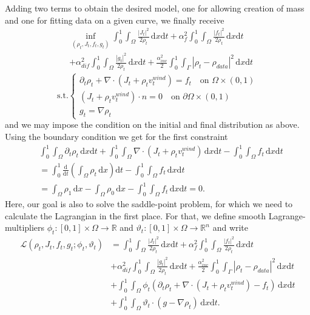 Adding two terms to obtain the desired model, one for allowing creation of mass and one for fitting data on a given curve, we finally receive 
\begin{align*}
&\inf_{(\rho_t, J_t, f_t, g_t)} \int_0^1\int_\Omega \frac{|J_t|^2}{2\rho_t}\,\mathrm{d}x\mathrm{d}t + \alpha_f^2 \int_0^1\int_\Omega \frac{|f_t|^2}{2\rho_t}\,\mathrm{d}x\mathrm{d}t \\&+ \alpha_{dif}^2\int_0^1\int_\Omega\frac{|g_t|^2}{2\rho_t}\,\mathrm{d}x\mathrm{d}t + \frac{\alpha_{inv}^2}{2}\int_0^1\int_{\Gamma}|\rho_t - \rho_{data}|^2\,\mathrm{d}x\mathrm{d}t
\end{align*}
$$
\text{s.t.} \begin{cases}
	\partial_t\rho_t + \nabla \cdot (J_t + \rho_tv_t^{wind}) = f_t\quad \text{on } \Omega\times(0,1)\\
(J_t + \rho_tv_t^{wind}) \cdot n = 0 \quad \text{on }\partial \Omega \times (0,1)\\
g_t = \nabla\rho_t
\end{cases}
$$
and we may impose the condition on the initial and final distribution as above. Using the boundary condition we get for the first constraint
\begin{align*}
&\int_0^1\int_\Omega \partial_t\rho_t\,\mathrm{d}x\mathrm{d}t + \int_0^1\int_\Omega \nabla \cdot (J_t + \rho_tv_t^{wind} )\,\mathrm{d}x\mathrm{d}t - \int_0^1\int_\Omega f_t\,\mathrm{d}x\mathrm{d}t\\
&= \int_0^1\frac{\mathrm{d}}{\mathrm{d}t}\left(\int_\Omega \rho_t\,\mathrm{d}x\right)\mathrm{d}t - \int_0^1\int_\Omega f_t\, \mathrm{d}x\mathrm{d}t\\
&= \int_\Omega\rho_1 \,\mathrm{d}x - \int_\Omega \rho_0\,\mathrm{d}x - \int_0^1\int_\Omega f_t \,\mathrm{d}x\mathrm{d}t = 0.
\end{align*}
Here, our goal is also to solve the saddle-point problem, for which we need to calculate the Lagrangian in the first place. For that, we define smooth Lagrange-multipliers $\phi_t:[0,1]\times \Omega\to \mathbb{R}$ and $\vartheta_t:[0,1]\times \Omega\to \mathbb{R}^n$ and write
\begin{align*}
	\mathcal{L}(\rho_t, J_t, f_t, g_t; \phi_t, \vartheta_t) &= \int_0^1\int_\Omega \frac{|J_t|^2}{2\rho_t}\,\mathrm{d}x\mathrm{d}t  + \alpha_f^2\int_0^1\int_\Omega \frac{|f_t|^2}{2\rho_t}\,\mathrm{d}x\mathrm{d}t\\
														  &+\alpha_{dif}^2\int_0^1\int_\Omega \frac{|g_t|^2}{2\rho_t}\,\mathrm{d}x\mathrm{d}t + \frac{\alpha_{inv}^2}{2}\int_0^1\int_\Gamma |\rho_t-\rho_{data}|^2\,\mathrm{d}x\mathrm{d}t\\
														  &+\int_0^1\int_\Omega\phi_t(\partial_t\rho_t + \nabla \cdot (J_t + \rho_tv_t^{wind})-f_t)\,\mathrm{d}x\mathrm{d}t\\
														  &+ \int_0^1\int_\Omega \vartheta_t \cdot (g-\nabla\rho_t)\,\mathrm{d}x\mathrm{d}t.
\end{align*}
